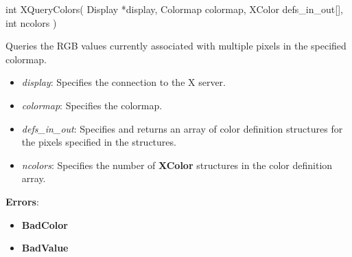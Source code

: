 \documentclass{report}
\begin{document}
\begin{itemize}
            \begin{cppcode}
                int XQueryColors(
                    Display *display,
                    Colormap colormap,
                    XColor defs_in_out[],
                    int ncolors
                )
            \end{cppcode}
            \bigbreak \noindent
            Queries the RGB values currently associated with multiple pixels in the specified colormap.
            \begin{itemize}
                \item \textit{display}: Specifies the connection to the X server.
                \item \textit{colormap}: Specifies the colormap.
                \item \textit{defs\_in\_out}: Specifies and returns an array of color definition structures for the pixels specified in the structures.
                \item \textit{ncolors}: Specifies the number of \textbf{XColor} structures in the color definition array.
            \end{itemize}
            \bigbreak \noindent
            \textbf{Errors}:
            \begin{itemize}
                \item \textbf{BadColor}
                \item \textbf{BadValue}
            \end{itemize}


\end{itemize}
\end{document}
